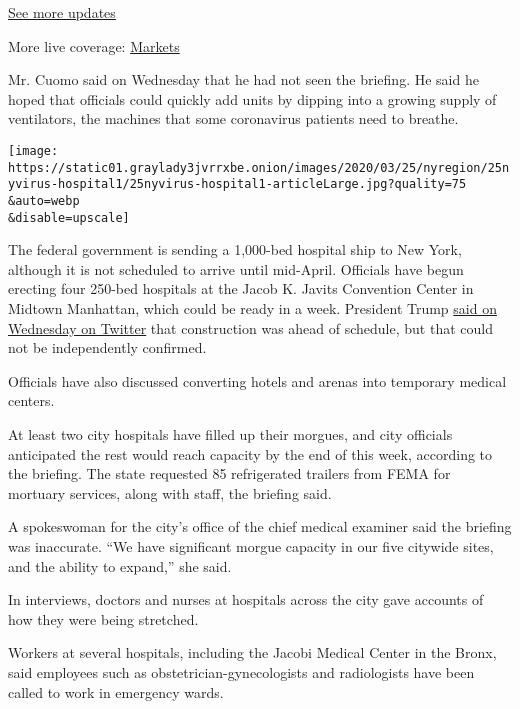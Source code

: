 \href{https://www.nytimes3xbfgragh.onion/2020/08/04/world/coronavirus-cases.html?action=click\&pgtype=Article\&state=default\&region=MAIN_CONTENT_1\&context=storylines_live_updates}{See
more updates}

More live coverage:
\href{https://www.nytimes3xbfgragh.onion/live/2020/08/04/business/stock-market-today-coronavirus?action=click\&pgtype=Article\&state=default\&region=MAIN_CONTENT_1\&context=storylines_live_updates}{Markets}

Mr. Cuomo said on Wednesday that he had not seen the briefing. He said
he hoped that officials could quickly add units by dipping into a
growing supply of ventilators, the machines that some coronavirus
patients need to breathe.

\texttt{[image: https://static01.graylady3jvrrxbe.onion/images/2020/03/25/nyregion/25nyvirus-hospital1/25nyvirus-hospital1-articleLarge.jpg?quality=75\\\&auto=webp\\\&disable=upscale]}

The federal government is sending a 1,000-bed hospital ship to New York,
although it is not scheduled to arrive until mid-April. Officials have
begun erecting four 250-bed hospitals at the Jacob K. Javits Convention
Center in Midtown Manhattan, which could be ready in a week. President
Trump
\href{https://twitter.com/realDonaldTrump/status/1242826052310794240}{said
on Wednesday on Twitter} that construction was ahead of schedule, but
that could not be independently confirmed.

Officials have also discussed converting hotels and arenas into
temporary medical centers.

At least two city hospitals have filled up their morgues, and city
officials anticipated the rest would reach capacity by the end of this
week, according to the briefing. The state requested 85 refrigerated
trailers from FEMA for mortuary services, along with staff, the briefing
said.

A spokeswoman for the city's office of the chief medical examiner said
the briefing was inaccurate. ``We have significant morgue capacity in
our five citywide sites, and the ability to expand,'' she said.

In interviews, doctors and nurses at hospitals across the city gave
accounts of how they were being stretched.

Workers at several hospitals, including the Jacobi Medical Center in the
Bronx, said employees such as obstetrician-gynecologists and
radiologists have been called to work in emergency wards.

